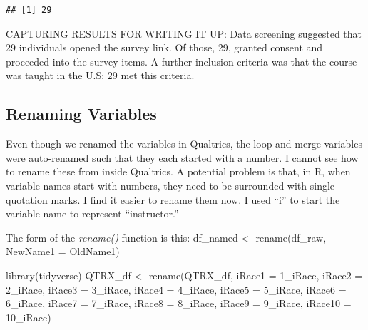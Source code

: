 \documentclass[
  english,
]{book}
\newenvironment{Shaded}{\begin{snugshade}}{\end{snugshade}}
\newcommand{\AttributeTok}[1]{\textcolor[rgb]{0.77,0.63,0.00}{#1}}
\newcommand{\FunctionTok}[1]{\textcolor[rgb]{0.00,0.00,0.00}{#1}}
\newcommand{\NormalTok}[1]{#1}
\newcommand{\OtherTok}[1]{\textcolor[rgb]{0.56,0.35,0.01}{#1}}
\newcommand{\StringTok}[1]{\textcolor[rgb]{0.31,0.60,0.02}{#1}}
\begin{document}
\begin{verbatim}
## [1] 29
\end{verbatim}

CAPTURING RESULTS FOR WRITING IT UP: Data screening suggested that 29 individuals opened the survey link. Of those, 29, granted consent and proceeded into the survey items. A further inclusion criteria was that the course was taught in the U.S; 29 met this criteria.

\hypertarget{renaming-variables}{%
\subsection{Renaming Variables}\label{renaming-variables}}

Even though we renamed the variables in Qualtrics, the loop-and-merge variables were auto-renamed such that they each started with a number. I cannot see how to rename these from inside Qualtrics. A potential problem is that, in R, when variable names start with numbers, they need to be surrounded with single quotation marks. I find it easier to rename them now. I used ``i'' to start the variable name to represent ``instructor.''

The form of the \emph{rename()} function is this:
df\_named \textless- rename(df\_raw, NewName1 = OldName1)

\begin{Shaded}
\begin{Highlighting}[]
\FunctionTok{library}\NormalTok{(tidyverse)}
\NormalTok{QTRX\_df }\OtherTok{\textless{}{-}} \FunctionTok{rename}\NormalTok{(QTRX\_df, }\AttributeTok{iRace1 =} \StringTok{\textquotesingle{}1\_iRace\textquotesingle{}}\NormalTok{, }\AttributeTok{iRace2 =} \StringTok{\textquotesingle{}2\_iRace\textquotesingle{}}\NormalTok{, }\AttributeTok{iRace3 =} \StringTok{\textquotesingle{}3\_iRace\textquotesingle{}}\NormalTok{, }\AttributeTok{iRace4 =} \StringTok{\textquotesingle{}4\_iRace\textquotesingle{}}\NormalTok{, }\AttributeTok{iRace5 =} \StringTok{\textquotesingle{}5\_iRace\textquotesingle{}}\NormalTok{, }\AttributeTok{iRace6 =} \StringTok{\textquotesingle{}6\_iRace\textquotesingle{}}\NormalTok{, }\AttributeTok{iRace7 =} \StringTok{\textquotesingle{}7\_iRace\textquotesingle{}}\NormalTok{, }\AttributeTok{iRace8 =} \StringTok{\textquotesingle{}8\_iRace\textquotesingle{}}\NormalTok{, }\AttributeTok{iRace9 =} \StringTok{\textquotesingle{}9\_iRace\textquotesingle{}}\NormalTok{, }\AttributeTok{iRace10 =} \StringTok{\textquotesingle{}10\_iRace\textquotesingle{}}\NormalTok{)}
\end{Highlighting}
\end{Shaded}
\end{document}
